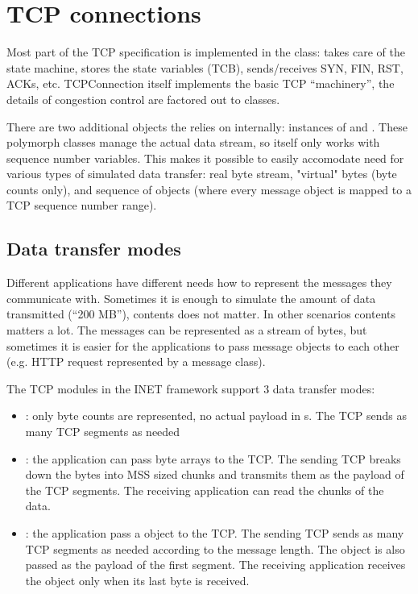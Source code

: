 \section{TCP connections}

Most part of the TCP specification is implemented in the
 class: takes care of the state machine,
stores the state variables (TCB), sends/receives SYN, FIN, RST, ACKs, etc.
TCPConnection itself implements the basic TCP ``machinery'',
the details of congestion control are factored out to
 classes.

There are two additional objects the 
relies on internally: instances of  and
. These polymorph classes manage the actual data stream,
so  itself only works with sequence number variables.
This makes it possible to easily accomodate need for various types of
simulated data transfer: real byte stream, "virtual" bytes (byte counts
only), and sequence of  objects (where every message object is
mapped to a TCP sequence number range).

\subsection{Data transfer modes}

Different applications have different needs how to represent
the messages they communicate with. Sometimes it is enough to
simulate the amount of data transmitted (``200 MB''), contents
does not matter. In other scenarios contents matters a lot.
The messages can be represented as a stream of bytes, but
sometimes it is easier for the applications to pass message
objects to each other (e.g. HTTP request represented by a
 message class).

The TCP modules in the INET framework support 3 data transfer modes:

\begin{itemize}
  \item {}: only byte counts are
        represented, no actual payload in s.
        The TCP sends as many TCP segments as needed
  \item {}: the application can pass
        byte arrays to the TCP. The sending TCP breaks down the bytes
        into MSS sized chunks and transmits them as the payload
        of the TCP segments. The receiving application can read the
        chunks of the data.
  \item {}: the application pass a
         object to the TCP. The sending
        TCP sends as many TCP segments as needed according to
        the message length. The  object
        is also passed as the payload of the first segment. %
        The receiving application receives the object only
        when its last byte is received.
\end{itemize}

